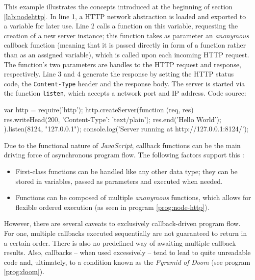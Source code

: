 \begin{program}
  \caption{This example illustrates the concepts introduced at the beginning of section \ref{lab:nodehttp}. In line 1, a HTTP network abstraction is loaded and exported to a variable for later use. Line 2 calls a function on this variable, requesting the creation of a new server instance; this function takes as parameter an \textit{anonymous} callback function (meaning that it is passed directly in form of a function rather than as an assigned variable), which is called upon each incoming HTTP request. The function's two parameters are handles to the HTTP request and response, respectively. Line 3 and 4 generate the response by setting the HTTP status code, the \texttt{Content-Type} header and the response body. The server is started via the function \texttt{listen}, which accepts a network port and IP address. Code source: \cite[p. 9]{Hughes-Croucher2012}}
  \label{prog:node-http}
  \begin{JavaCode}
var http = require('http');
http.createServer(function (req, res) {
    res.writeHead(200, {'Content-Type': 'text/plain'}); 
    res.end('Hello World\n');
}).listen(8124, "127.0.0.1");
console.log('Server running at http://127.0.0.1:8124/');
  \end{JavaCode}
\end{program}

Due to the functional nature of \textit{JavaScript}, callback functions can be the main driving force of asynchronous program flow. The following factors support this \cite{node-loop}:
\begin{itemize}
  \item First-class functions can be handled like any other data type; they can be stored in variables, passed as parameters and executed when needed.
  \item Functions can be composed of multiple \textit{anonymous} functions, which allows for flexible ordered execution (as seen in program \ref{prog:node-http}).
\end{itemize}

However, there are several caveats to exclusively callback-driven program flow. For one, multiple callbacks executed sequentially are not guaranteed to return in a certain order. There is also no predefined way of awaiting multiple callback results. Also, callbacks -- when used excessively -- tend to lead to quite unreadable code and, ultimately, to a condition known as the \textit{Pyramid of Doom} (see program \ref{prog:doom}).

